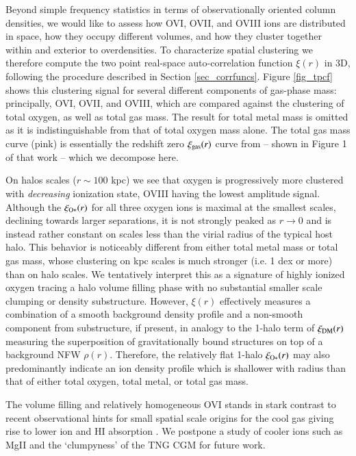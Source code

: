 \documentclass[useAMS,usenatbib]{mnras}
\newcommand{\ovi}{OVI\xspace}
\newcommand{\ovii}{OVII\xspace}
\newcommand{\oviii}{OVIII\xspace}
\begin{document}
Beyond simple frequency statistics in terms of observationally oriented column densities, we would like to assess how \ovi, \ovii, and \oviii ions are distributed in space, how they occupy different volumes, and how they cluster together within and exterior to overdensities. To characterize spatial clustering we therefore compute the two point real-space auto-correlation function $\xi(r)$ in 3D, following the procedure described in Section \ref{sec_corrfuncs}. Figure \ref{fig_tpcf} shows this clustering signal for several different components of gas-phase mass: principally, \ovi, \ovii, and \oviii, which are compared against the clustering of total oxygen, as well as total gas mass. The result for total metal mass is omitted as it is indistinguishable from that of total oxygen mass alone. The total gas mass curve (pink) is essentially the redshift zero $\xi_{\rm gas}(r)$ curve from \cite{springel18} -- shown in Figure 1 of that work -- which we decompose here. 

On halos scales ($r \sim 100$ kpc) we see that oxygen is progressively more clustered with \textit{decreasing} ionization state, \oviii having the lowest amplitude signal. Although the $\xi_{\rm O*}(r)$ for all three oxygen ions is maximal at the smallest scales, declining towards larger separations, it is not strongly peaked as $r \rightarrow 0$ and is instead rather constant on scales less than the virial radius of the typical host halo. This behavior is noticeably different from either total metal mass or total gas mass, whose clustering on kpc scales is much stronger (i.e. 1 dex or more) than on halo scales. We tentatively interpret this as a signature of highly ionized oxygen tracing a halo volume filling phase with no substantial smaller scale clumping or density substructure. However, $\xi(r)$ effectively measures a combination of a smooth background density profile and a non-smooth component from substructure, if present, in analogy to the 1-halo term of $\xi_{\rm DM}(r)$ measuring the superposition of gravitationally bound structures on top of a background NFW $\rho(r)$. Therefore, the relatively flat 1-halo $\xi_{\rm O*}(r)$ may also predominantly indicate an ion density profile which is shallower with radius than that of either total oxygen, total metal, or total gas mass.

The volume filling and relatively homogeneous \ovi stands in stark contrast to recent observational hints for small spatial scale origins for the cool gas giving rise to lower ion and HI absorption \citep[e.g.][]{crighton15,battaia15,chen17,stern16}. We postpone a study of cooler ions such as MgII and the `clumpyness' of the TNG CGM for future work. 
\end{document}
